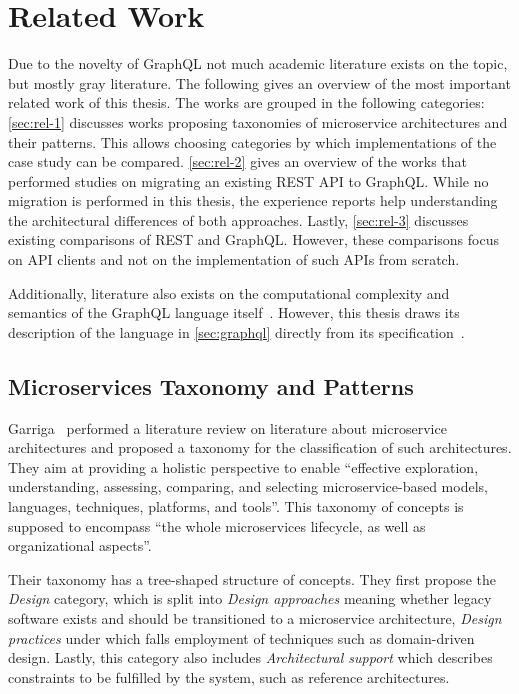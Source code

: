 \section{Related Work}\label{sec:related}

Due to the novelty of GraphQL not much academic literature exists on the topic, but mostly gray literature.
The following gives an overview of the most important related work of this thesis.
The works are grouped in the following categories:
\autoref{sec:rel-1} discusses works proposing taxonomies of microservice architectures and their patterns.
This allows choosing categories by which implementations of the case study can be compared.
\autoref{sec:rel-2} gives an overview of the works that performed studies on migrating an existing \ac{REST} \ac{API} to GraphQL.
While no migration is performed in this thesis, the experience reports help understanding the architectural differences of both approaches.
Lastly, \autoref{sec:rel-3} discusses existing comparisons of \ac{REST} and GraphQL.
However, these comparisons focus on \ac{API} clients and not on the implementation of such \acp{API} from scratch.

Additionally, literature also exists on the computational complexity and semantics of the GraphQL language itself~\cite{Hartig2017, Hartig2018}.
However, this thesis draws its description of the language in \autoref{sec:graphql} directly from its specification~\cite{Facebook2018}.

\subsection{Microservices Taxonomy and Patterns}\label{sec:rel-1}

Garriga~\cite{Garriga2017} performed a literature review on literature about microservice architectures and proposed a taxonomy for the classification of such architectures.
They aim at providing a holistic perspective to enable ``effective exploration, understanding, assessing, comparing, and selecting microservice-based models, languages, techniques, platforms, and tools''.
This taxonomy of concepts is supposed to encompass ``the whole microservices lifecycle, as well as organizational aspects''.

Their taxonomy has a tree-shaped structure of concepts.
They first propose the \textit{Design} category, which is split into \textit{Design approaches} meaning whether legacy software exists and should be transitioned to a microservice architecture, \textit{Design practices} under which falls employment of techniques such as domain-driven design.
Lastly, this category also includes \textit{Architectural support} which describes constraints to be fulfilled by the system, such as reference architectures.

